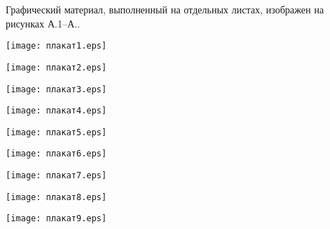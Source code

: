 
Графический материал, выполненный на отдельных листах,
изображен на рисунках А.1--А..
\setcounter{числоПлакатов}{0}

\renewcommand{\thefigure}{А.\arabic{figure}} %

\begin{landscape}

\begin{плакат}
    \texttt{[image: плакат1.eps]}
    \label{pl1:image}      
\end{плакат}

\begin{плакат}
    \texttt{[image: плакат2.eps]}
    \label{pl2:image}      
\end{плакат}

\begin{плакат}
    \texttt{[image: плакат3.eps]}
    \label{pl3:image}      
\end{плакат}

\begin{плакат}
    \texttt{[image: плакат4.eps]}
    \label{pl4:image}      
\end{плакат}

\begin{плакат}
    \texttt{[image: плакат5.eps]}
    \label{pl5:image}
\end{плакат}

\begin{плакат}
    \texttt{[image: плакат6.eps]}
    \label{pl6:image}
\end{плакат}

\begin{плакат}
    \texttt{[image: плакат7.eps]}
    \label{pl7:image}
\end{плакат}

\begin{плакат}
    \texttt{[image: плакат8.eps]}
    \label{pl8:image}
\end{плакат}

\begin{плакат}
    \texttt{[image: плакат9.eps]}
    \label{pl9:image}
\end{плакат}

\end{landscape}
